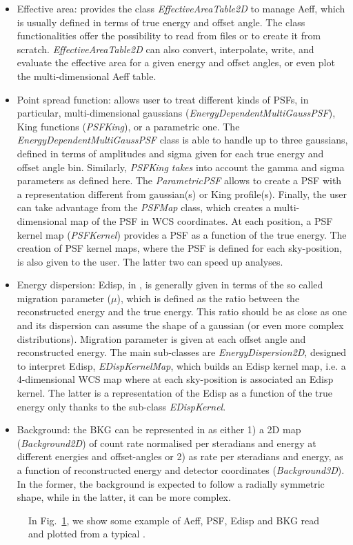 \begin{itemize}
\item Effective area: \gammapy provides the class {\it EffectiveAreaTable2D} to manage Aeff, which is usually defined in terms of true energy and offset angle. The class functionalities offer the possibility to read from files or to create it from scratch. {\it EffectiveAreaTable2D} can also convert, interpolate, write, and evaluate the effective area for a given energy and offset angles, or even plot the multi-dimensional Aeff table.

\item Point spread function: \gammapy allows user to treat different kinds of PSFs, in particular, multi-dimensional gaussians ({\it EnergyDependentMultiGaussPSF}), King functions ({\it PSFKing}), or a parametric one. The {\it EnergyDependentMultiGaussPSF} class is able to handle up to three gaussians, defined in terms of amplitudes and sigma given for each true energy and offset angle bin. Similarly, {\it PSFKing takes} into account the gamma and sigma parameters as defined here. The {\it ParametricPSF} allows to create a PSF with a representation different from gaussian(s) or King profile(s). Finally, the user can take advantage from the {\it PSFMap} class, which creates a multi-dimensional map of the PSF in WCS coordinates. At each position, a PSF kernel map ({\it PSFKernel}) provides a PSF as a function of the true energy. The creation of PSF kernel maps, where the PSF is defined for each sky-position, is also given to the user. The latter two can speed up analyses.

\item Energy dispersion: Edisp, in \iact, is generally given in terms of the so called migration parameter ($\mu$), which is defined as the ratio between the reconstructed energy
and the true energy. This ratio should be as close as one and its dispersion can assume the shape of a gaussian (or even more complex distributions). Migration parameter
is given at each offset angle and reconstructed energy. The main sub-classes are {\it EnergyDispersion2D}, designed to interpret Edisp, {\it EDispKernelMap}, which builds an
Edisp kernel map, i.e. a 4-dimensional WCS map where at each sky-position is associated an Edisp kernel. The latter is a representation of the Edisp as a function of the true energy only thanks to the sub-class {\it EDispKernel}.

\item Background: the BKG can be represented in \gammapy as either 1) a 2D map ({\it Background2D}) of count rate normalised per steradians and energy at different energies
and offset-angles or 2) as rate per steradians and energy, as a function of reconstructed energy and detector coordinates ({\it Background3D}). In the former, the background is expected to follow a radially symmetric shape, while in the latter, it can be more complex.
\end{itemize}

\begin{figure}

	\caption{In Fig.~\ref{ig*:minted:irf_examples}, we show some example of Aeff, PSF, Edisp and BKG read and plotted from a typical \irf.}
	\label{ig*:minted:irf_examples}
\end{figure}

